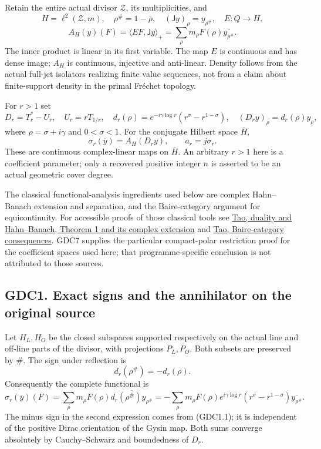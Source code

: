 Retain the entire actual divisor \(\mathscr Z\), its multiplicities, and
\[
H=\ell^2(\mathscr Z,m),\quad \rho^\#=1-\overline\rho,
\quad (\mathsf Jy)_\rho=y_{\rho^\#},\quad
E:Q\to H,
\] \[
A_H(y)(F)=\langle EF,\mathsf Jy\rangle_+
=\sum_\rho m_\rho F(\rho)\overline{y_{\rho^\#}}.
\tag{GDC0.3}
\] The inner product is linear in its first variable. The map \(E\) is
continuous and has dense image; \(A_H\) is continuous, injective and
anti-linear. Density follows from the actual full-jet isolators
realizing finite value sequences, not from a claim about finite-support
density in the primal Fréchet topology.

For \(r>1\) set \[
D_r=T_r^*-U_r,\quad U_r=rT_{1/r},\quad
d_r(\rho)=e^{-i\gamma\log r}(r^\sigma-r^{1-\sigma}),
\quad(D_ry)_\rho=d_r(\rho)y_\rho,
\tag{GDC0.4}
\] where \(\rho=\sigma+i\gamma\) and \(0<\sigma<1\). For the conjugate
Hilbert space \(\overline H\), \[
\sigma_r(\overline y)=A_H(D_ry),\qquad a_r=j\sigma_r.
\tag{GDC0.5}
\] These are continuous complex-linear maps on \(\overline H\). An
arbitrary \(r>1\) here is a coefficient parameter; only a recovered
positive integer \(n\) is asserted to be an actual geometric cover
degree.

The classical functional-analysis ingredients used below are complex
Hahn--Banach extension and separation, and the Baire-category argument
for equicontinuity. For accessible proofs of those classical tools see
\href{https://terrytao.wordpress.com/2009/01/26/245b-notes-6-duality-and-the-hahn-banach-theorem/}{Tao,
duality and Hahn--Banach, Theorem 1 and its complex extension} and
\href{https://terrytao.wordpress.com/2009/02/01/245b-notes-9-the-baire-category-theorem-and-its-banach-space-consequences/}{Tao,
Baire-category consequences}. GDC7 supplies the particular compact-polar
restriction proof for the coefficient spaces used here; that
programme-specific conclusion is not attributed to those sources.

\subsection{GDC1. Exact signs and the annihilator on the original
source}\label{gdc1.-exact-signs-and-the-annihilator-on-the-original-source}

Let \(H_L,H_O\) be the closed subspaces supported respectively on the
actual line and off-line parts of the divisor, with projections
\(P_L,P_O\). Both subsets are preserved by \(\#\). The sign under
reflection is \[
d_r(\rho^\#)=-d_r(\rho).
\tag{GDC1.1}
\] Consequently the complete functional is \[
\sigma_r(\overline y)(F)
=\sum_\rho m_\rho F(\rho)
 \overline{d_r(\rho^\#)y_{\rho^\#}}
=-\sum_\rho m_\rho F(\rho)e^{i\gamma\log r}
 (r^\sigma-r^{1-\sigma})\overline{y_{\rho^\#}}.
\tag{GDC1.2}
\] The minus sign in the second expression comes from (GDC1.1); it is
independent of the positive Dirac orientation of the Gysin map. Both
sums converge absolutely by Cauchy--Schwarz and boundedness of \(D_r\).

